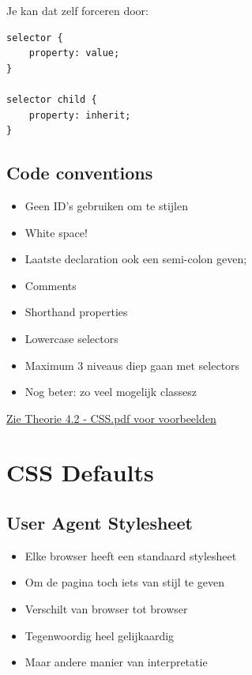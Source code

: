 \documentclass{article}
\begin{document}
Je kan dat zelf forceren door:
\begin{lstlisting}
selector {     
    property: value; 
} 

selector child {
    property: inherit; 
}
\end{lstlisting}

\subsection{Code conventions}
\begin{itemize}
    \item Geen ID’s gebruiken om te stijlen 
    \item White space! 
    \item Laatste declaration ook een semi-colon geven; 
    \item Comments
    \item Shorthand properties
    \item Lowercase selectors
    \item Maximum 3 niveaus diep gaan met selectors
    \item Nog beter: zo veel mogelijk classesz
\end{itemize}

\underline{Zie Theorie 4.2 - CSS.pdf voor voorbeelden}

\section{CSS Defaults}

\subsection{User Agent Stylesheet}
\begin{itemize}
    \item Elke browser heeft een standaard stylesheet
    \item Om de pagina toch iets van stijl te geven 
    \item Verschilt van browser tot browser
    \item Tegenwoordig heel gelijkaardig
    \item Maar andere manier van interpretatie
\end{itemize}
\end{document}

